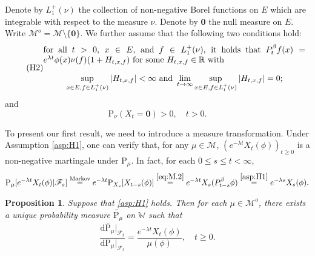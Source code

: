 \documentclass[12pt,a4paper]{amsart}
\numberwithin{equation}{section}
\theoremstyle{plain}
\newtheorem{prop}[thm]{Proposition}
\theoremstyle{definition}
\theoremstyle{remark}
\begin{document}
	Denote by $L_1^+(\nu)$ the collection of non-negative Borel functions on $E$ which are integrable with respect to the measure $\nu$.
	Denote by $\mathbf 0$ the null measure on $E$.
	Write $\mathcal M^o = \mathcal M\setminus \{\mathbf 0\}$.
	We further assume that the following two conditions hold:
\begin{equation} \label{asp:H2} \tag{H2}
\begin{minipage}{0.9\textwidth}
	for all $t>0$, $x\in E$, and $f\in L_1^+(\nu)$, it holds that $P_t^\beta f(x) = e^{\lambda t} \phi(x) \nu(f) (1+ H_{t,x,f})$ for some $H_{t,x,f}\in \mathbb R$ with
\[
	\sup_{x\in E, f\in L_1^+(\nu)} |H_{t,x,f}|
	< \infty
	\text{ and }
	\lim_{t\to \infty} \sup_{x\in E, f\in L_1^+(\nu)} |H_{t,x,f}|
	= 0;
\]
\end{minipage}
\end{equation}
	and
\begin{equation} \label{asp:H3} \tag{H3}
	\mathrm P_\nu(X_t = \mathbf 0)>0, \quad t> 0.
\end{equation}

	To present our first result, we need to introduce a measure transformation.
	Under Assumption \eqref{asp:H1}, one can verify that, for any $\mu \in \mathcal M$, $(e^{-\lambda t}  X_t(\phi))_{t\geq 0}$ is a non-negative martingale under $\mathrm P_\mu$.
	In fact, for each $0\leq s\leq t< \infty$,
\begin{equation} \label{eq:M.25}
	\mathrm P_\mu[e^{-\lambda t}X_t(\phi)|\mathscr F_s]
	\overset{\text{Markov}} = e^{-\lambda t} \mathrm P_{X_s}[X_{t-s}(\phi)]
	\overset{\eqref{eq:M.2}}= e^{-\lambda t}X_s(P_{t-s}^\beta \phi)
	\overset{\eqref{asp:H1}}=e^{-\lambda s}X_s(\phi).
\end{equation}
	\begin{prop} \label{thm:T}
	Suppose that \eqref{asp:H1} holds. Then for each $\mu \in \mathcal M^o$, there exists a unique probability measure $\widetilde {\mathrm P_\mu}$ on $\mathbb W$ such that
\begin{equation} \label{eq:M.3}
	\frac{{\mathrm d}\widetilde{\mathrm P_\mu}|_{\mathscr F_t}}
	{{\mathrm d}\mathrm P_\mu|_{\mathscr F_t}}
	=\frac{e^{-\lambda t}X_t(\phi)}{\mu(\phi) },
	\quad t\geq 0.
\end{equation}
\end{prop}
\end{document}
